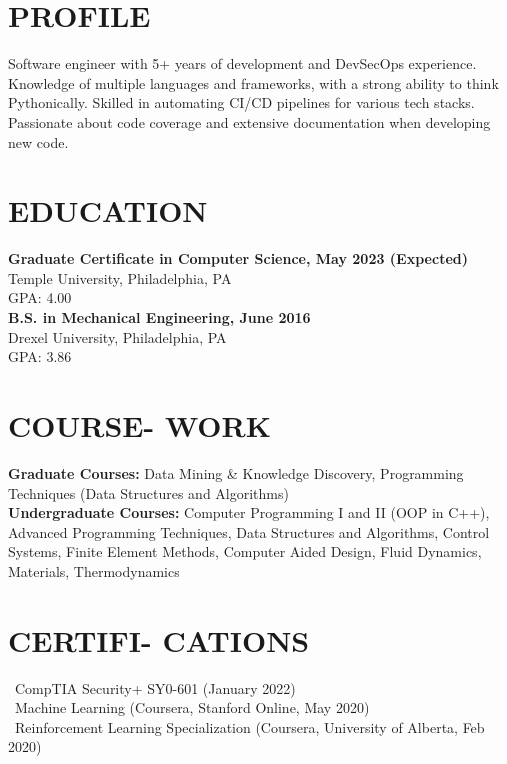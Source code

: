 \documentclass[line,resmargin,11pt]{res}
\begin{document}
\begin{resume}

\section{PROFILE}
Software engineer with 5+ years of development and DevSecOps experience. Knowledge of multiple languages and frameworks, with a strong ability to think Pythonically. 
Skilled in automating CI/CD pipelines for various tech stacks. Passionate about code coverage and extensive documentation when developing new code.
 
\section{EDUCATION}
\textbf{Graduate Certificate in Computer Science, May 2023 (Expected)} \\
Temple University, Philadelphia, PA \\
GPA: 4.00 \\

\textbf{B.S. in Mechanical Engineering, June 2016} \\
Drexel University, Philadelphia, PA \\
GPA: 3.86

\section{COURSE- WORK}
\textbf{Graduate Courses:} Data Mining \& Knowledge Discovery, Programming Techniques (Data Structures and Algorithms) \\
\textbf{Undergraduate Courses:} Computer Programming I and II (OOP in C++), Advanced Programming Techniques, Data Structures and Algorithms, Control Systems, Finite Element Methods, Computer Aided Design, Fluid Dynamics, Materials, Thermodynamics \\

\section{CERTIFI- CATIONS}
\textbullet\ CompTIA Security+ SY0-601 (January 2022) \\
\textbullet\ Machine Learning (Coursera, Stanford Online, May 2020) \\
\textbullet\ Reinforcement Learning Specialization (Coursera, University of Alberta, Feb 2020)
	

\end{resume}
\end{document}
